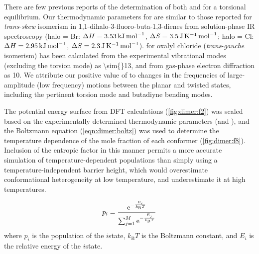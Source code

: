 		There are few previous reports of the determination of both \delh and \dels for a torsional equilibrium. Our thermodynamic parameters for  are similar to those reported for \textit{trans}-\textit{skew} isomerism in 1,1-dihalo-3-fluoro-buta-1,3-dienes from solution-phase IR spectroscopy (halo = Br: $\Delta H = \SI{3.53}{\kilo\joule\per\mole}$, $\Delta S = \SI{3.5}{\joule\per\kelvin\per\mole}$; halo = Cl: $\Delta H = \SI{2.95}{\kilo\joule\per\mole}$, $\Delta S = \SI{2.3}{\joule\per\kelvin\per\mole}$).\autocite{Hartman1968} \dels for oxalyl chloride (\textit{trans}-\textit{gauche} isomerism) has been calculated from the experimental vibrational modes (excluding the torsion mode) as \SI{\sim{}13}{\jkmol},\autocite{Durig1992} and from gas-phase electron diffraction as \SI{10}{\jkmol}.\autocite{Hagen1973} We attribute our positive value of \dels to changes in the frequencies of large-amplitude (low frequency) motions between the planar and twisted states, including the pertinent torsion mode and butadiyne bending modes.

		The potential energy surface from DFT calculations (\autoref{fig:dimer:f2}) was scaled based on the experimentally determined thermodynamic parameters (\delh and \dels), and the Boltzmann equation (\autoref{eqn:dimer:boltz}) was used to determine the temperature dependence of the mole fraction of each conformer (\autoref{fig:dimer:f8}). Inclusion of the entropic factor in this manner permits a more accurate simulation of temperature-dependent populations than simply using a temperature-independent barrier height, which would overestimate conformational heterogeneity at low temperature, and underestimate it at high temperatures.

		\begin{equation}\label{eqn:dimer:boltz}
			p_i = \frac{\mathrm{e}^{-\frac{E_i}{k_\text{B}T}}}{\sum_{j=1}^M \mathrm{e}^{-\frac{E_j}{k_\text{B}T}}}
		\end{equation}
		\noindent{}where $p_i$ is the population of the $i$\nth state, $k_\text{B}T$ is the Boltzmann constant, and $E_i$ is the relative energy of the $i$\nth state. 


